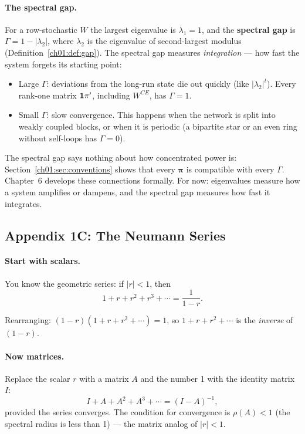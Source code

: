\documentclass[../structural_economics_book.tex]{subfiles}
\begin{document}
\paragraph{The spectral gap.} For a row-stochastic $W$ the largest eigenvalue is $\lambda_1 = 1$, and the \textbf{spectral gap} is $\Gamma = 1 - |\lambda_2|$, where $\lambda_2$ is the eigenvalue of second-largest modulus (Definition~\ref{ch01:def:gap}). The spectral gap measures \textit{integration} --- how fast the system forgets its starting point:
\begin{itemize}
\item Large $\Gamma$: deviations from the long-run state die out quickly (like $|\lambda_2|^t$). Every rank-one matrix $\mathbf{1}\pi'$, including $W^{CE}$, has $\Gamma = 1$.
\item Small $\Gamma$: slow convergence. This happens when the network is split into weakly coupled blocks, or when it is periodic (a bipartite star or an even ring without self-loops has $\Gamma = 0$).
\end{itemize}

The spectral gap says nothing about how concentrated power is: Section~\ref{ch01:sec:conventions} shows that every $\boldsymbol{\pi}$ is compatible with every $\Gamma$. Chapter~6 develops these connections formally. For now: eigenvalues measure how a system amplifies or dampens, and the spectral gap measures how fast it integrates.


\subsection*{Appendix 1C: The Neumann Series}
\label{ch01:app:neumann}

\paragraph{Start with scalars.} You know the geometric series: if $|r| < 1$, then
\begin{equation}
1 + r + r^2 + r^3 + \cdots = \frac{1}{1 - r}.
\end{equation}

Rearranging: $(1 - r)(1 + r + r^2 + \cdots) = 1$, so $1 + r + r^2 + \cdots$ is the \textit{inverse} of $(1 - r)$.

\paragraph{Now matrices.} Replace the scalar $r$ with a matrix $A$ and the number 1 with the identity matrix $I$:
\begin{equation}\label{ch01:eq:neumann_app}
I + A + A^2 + A^3 + \cdots = (I - A)^{-1},
\end{equation}
provided the series converges. The condition for convergence is $\rho(A) < 1$ (the spectral radius is less than 1) --- the matrix analog of $|r| < 1$.
\end{document}

